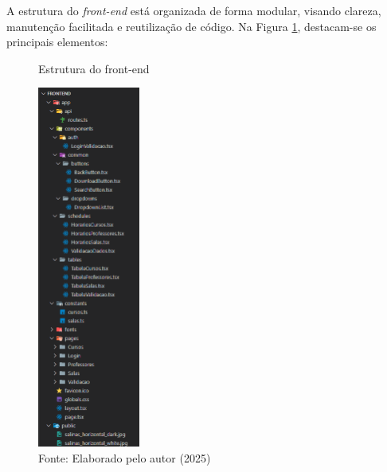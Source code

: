 A estrutura do \textit{front-end} está organizada de forma modular, visando clareza, manutenção facilitada e reutilização de código. Na Figura \ref{fig_front_14}, destacam-se os principais elementos:

\begin{figure}[htb]
    \centering
    \caption{Estrutura do front-end}
    \includegraphics[width=0.3\textwidth]{Figuras/front-14.png}
    \caption*{Fonte: Elaborado pelo autor (2025)}
    \label{fig_front_14}
\end{figure}

